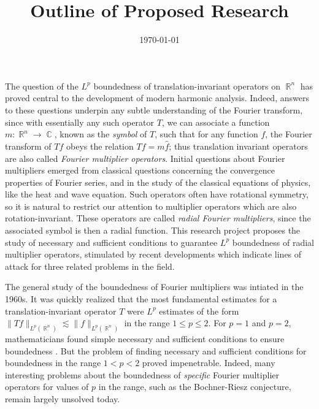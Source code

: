 \documentclass[12pt]{article}
\title{Outline of Proposed Research}
\author{}
\date{\today}
\DeclareMathOperator{\RR}{\mathbb{R}}
\DeclareMathOperator{\CC}{\mathbb{C}}
\theoremstyle{plain}
\theoremstyle{remark}
\theoremstyle{definition}
\begin{document}
\maketitle

\vspace{1em}

The question of the $L^p$ boundedness of translation-invariant operators on $\RR^n$ has proved central to the development of modern harmonic analysis. Indeed, answers to these questions underpin any subtle understanding of the Fourier transform, since with essentially any such operator $T$, we can associate a function $m: \RR^n \to \CC$, known as the \emph{symbol} of $T$, such that for any function $f$, the Fourier transform of $Tf$ obeys the relation $\widehat{Tf} = m \widehat{f}$; thus translation invariant operators are also called \emph{Fourier multiplier operators}. Initial questions about Fourier multipliers emerged from classical questions concerning the convergence properties of Fourier series, and in the study of the classical equations of physics, like the heat and wave equation. Such operators often have rotational symmetry, so it is natural to restrict our attention to multiplier operators which are also rotation-invariant. These operators are called \emph{radial Fourier multipliers}, since the associated symbol is then a radial function. This research project proposes the study of necessary and sufficient conditions to guarantee $L^p$ boundedness of radial multiplier operators, stimulated by recent developments which indicate lines of attack for three related problems in the field.

The general study of the boundedness of Fourier multipliers was intiated in the 1960s. It was quickly realized that the most fundamental estimates for a translation-invariant operator $T$ were $L^p$ estimates of the form $\| Tf \|_{L^p(\RR^n)} \lesssim \| f \|_{L^p(\RR^n)}$ in the range $1 \leq p \leq 2$. For $p = 1$ and $p = 2$, mathematicians found simple necessary and sufficient conditions to ensure boundedness \cite{Hormander1}. But the problem of finding necessary and sufficient conditions for boundedness in the range $1 < p < 2$ proved impenetrable. Indeed, many interesting problems about the boundedness of \emph{specific} Fourier multiplier operators for values of $p$ in the range, such as the Bochner-Riesz conjecture, remain largely unsolved today.
\end{document}
